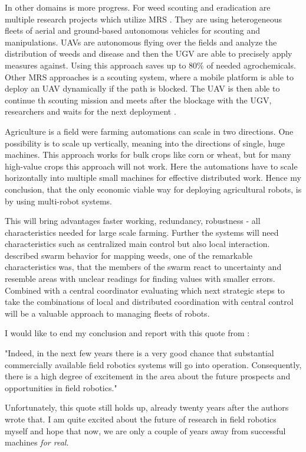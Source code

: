     In other domains is more progress. For weed scouting and eradication are multiple research projects which utilize MRS \cite{ConesaMunoz2015,Albani2019, deSantos2016}. They are using heterogeneous fleets of aerial and ground-based autonomous vehicles for scouting and manipulations. UAVs are autonomous flying over the fields and analyze the distribution of weeds and disease and then the UGV are able to precisely apply measures against. Using this approach saves up to 80\% of needed agrochemicals.
    Other MRS approaches is a scouting system, where a mobile platform is able to deploy an UAV dynamically if the path is blocked. The UAV is then able to continue th scouting mission and meets after the blockage with the UGV, researchers and waits for the next deployment \cite{Roldan2016}.

    Agriculture is a field were farming automations can scale in two directions. One possibility is to scale up vertically, meaning into the directions of single, huge machines. This approach works for bulk crops like corn or wheat, but for many high-value crops this approach will not work. Here the automations have to scale horizontally into multiple small machines for effective distributed work. Hence my conclusion, that the only economic viable way for deploying agricultural robots, is by using multi-robot systems.

    This will bring advantages faster working, redundancy, robustness - all characteristics needed for large scale farming. Further the systems will need characteristics such as centralized main control but also local interaction. \cite{Albani2019} described swarm behavior for mapping weeds, one of the remarkable characteristics was, that the members of the swarm react to  uncertainty and resemble areas with unclear readings for finding values with smaller errors. Combined with a central coordinator evaluating which next strategic steps to take the combinations of local and distributed coordination with central control will be a valuable approach to managing fleets of robots.

    I would like to end my conclusion and report with this quote from \cite{Thorpe2001}: 
    \begin{displayquote}[][]
        "Indeed, in the next few years there is a very good chance that substantial commercially available field robotics systems will go into operation. Consequently, there is a high degree of excitement in the area about the future prospects and opportunities in field robotics."
    \end{displayquote}

    Unfortunately, this quote still holds up, already twenty years after the authors wrote that. I am quite excited about the future of research in field robotics myself and hope that now, we are only a couple of years away from successful machines \emph{for real.}

 
